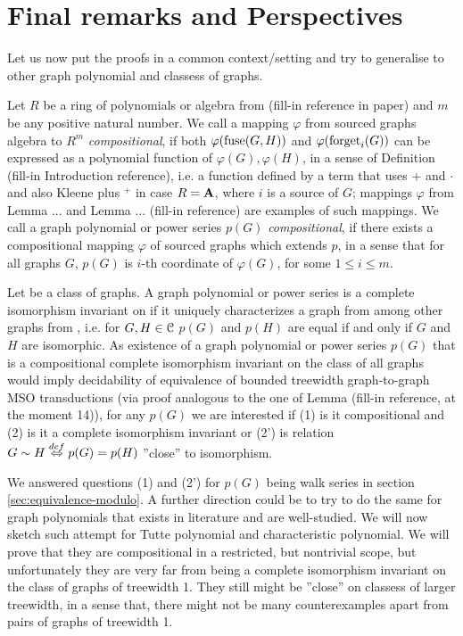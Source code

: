 \section{Final remarks and Perspectives}
Let us now put the proofs in a common context/setting and try to generalise to other graph polynomial and classess of graphs.

Let $R$ be a ring of polynomials or algebra \aalg from (fill-in reference in paper) and $m$ be any positive natural number. We call a mapping $\varphi$ from sourced graphs algebra to $R^m$ \emph{compositional}, if both $\varphi(\operatorname{fuse}(G, H))$ and $\varphi(\operatorname{forget}_i(G))$ can be expressed as a polynomial function of $\varphi(G), \varphi(H)$, in a sense of Definition (fill-in Introduction reference), i.e. a function defined by a term that uses + and $\cdot$ and also Kleene plus $^+$ in case $R = \mathbf{A}$, where $i$ is a source of $G$; mappings $\varphi$ from Lemma ... and Lemma ... (fill-in reference) are examples of such mappings. We call a graph polynomial or power series $p(G)$ \emph{compositional}, if there exists a compositional mapping $\varphi$ of sourced graphs which extends $p$, in a sense that for all graphs $G$, $p(G)$ is $i$-th coordinate of $\varphi(G)$, for some $1\leq i\leq m$.

Let \Cc be a class of graphs. A graph polynomial or power series is a complete isomorphism invariant on \Cc if it uniquely characterizes a graph from \Cc among other graphs from \Cc, i.e. for $G,H\in \mathcal{C}$ $p(G)$ and $p(H)$ are equal if and only if $G$ and $H$ are isomorphic. %
 As existence of a graph polynomial or power series $p(G)$ that is a compositional complete isomorphism invariant on the class of all graphs would imply decidability of equivalence of bounded treewidth graph-to-graph MSO transductions (via proof analogous to the one of Lemma (fill-in reference, at the moment 14)), for any $p(G)$ we are interested if (1) is it compositional and (2) is it a complete isomorphism invariant or (2') is relation $G \sim H \stackrel{def}{\Leftrightarrow} p(G) = p(H)$ ''close'' to isomorphism.

We answered questions (1) and (2') for $p(G)$ being walk series in section \ref{sec:equivalence-modulo}. A further direction could be to try to do the same for graph polynomials that exists in literature and are well-studied. We will now sketch such attempt for Tutte polynomial and characteristic polynomial. We will prove that they are compositional in a restricted, but nontrivial scope, but unfortunately they are very far from being a complete isomorphism invariant on the class of graphs of treewidth 1. They still might be ''close'' on classess of larger treewidth, in a sense that, there might not be many counterexamples apart from pairs of graphs of treewidth 1.
